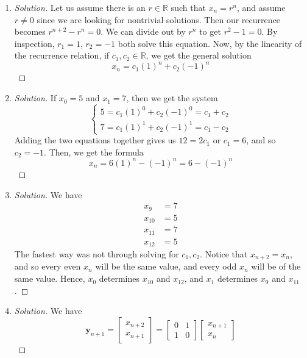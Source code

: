 \documentclass{article}
\newcommand{\R}{{\mathbb R}}
\begin{document}
\begin{enumerate}
	\item \begin{proof}[Solution]\let\qed\relax
		Let us assume there is an $r \in \R$ such that $x_n = r^n$,
		and assume $r \neq 0$ since we are looking for nontrivial solutions.
		Then our recurrence becomes $r^{n+2} - r^n = 0$.
		We can divide out by $r^n$ to get $r^2 - 1 = 0$.
		By inspection, $r_1 = 1$, $r_2 = -1$ both solve this equation.
		Now, by the linearity of the recurrence relation, if $c_1,c_2 \in \R$,
		we get the general solution
		\[
			x_n = c_1(1)^n + c_2(-1)^n
		\]
	\end{proof}
	\item \begin{proof}[Solution]\let\qed\relax
		If $x_0 = 5$ and $x_1 = 7$, then we get the system
		\[
			\begin{cases}
				5 = c_1(1)^0 + c_2(-1)^0 = c_1 + c_2\\
				7 = c_1(1)^1 + c_2(-1)^1 = c_1 - c_2
			\end{cases}
		\]
		Adding the two equations together gives us $12 = 2c_1$ or $c_1 = 6$,
		and so $c_2 = -1$.
		Then, we get the formula
		\[
			x_n = 6(1)^n - (-1)^n = 6 - (-1)^n
		\]
	\end{proof}
	\item \begin{proof}[Solution]\let\qed\relax
		We have
		\begin{align*}
			x_9 &= 7\\
			x_{10} &= 5\\
			x_{11} &= 7\\
			x_{12} &= 5
		\end{align*}
		The fastest way was not through solving for $c_1,c_2$.
		Notice that $x_{n+2} = x_n$, and so every even $x_n$
		will be the same value, and every odd $x_n$ will be of the same value.
		Hence, $x_0$ determines $x_{10}$ and $x_{12}$,
		and $x_1$ determines $x_9$ and $x_{11}$.
	\end{proof}
	\item \begin{proof}[Solution]\let\qed\relax
		We have
		\[
			\mathbf{y}_{n+1} = \begin{bmatrix} x_{n+2} \\ x_{n+1} \end{bmatrix}
			= \begin{bmatrix} 0 & 1 \\ 1 & 0 \end{bmatrix} \begin{bmatrix} x_{n+1} \\ x_n \end{bmatrix}
\]
\end{proof}
\end{enumerate}
\end{document}
